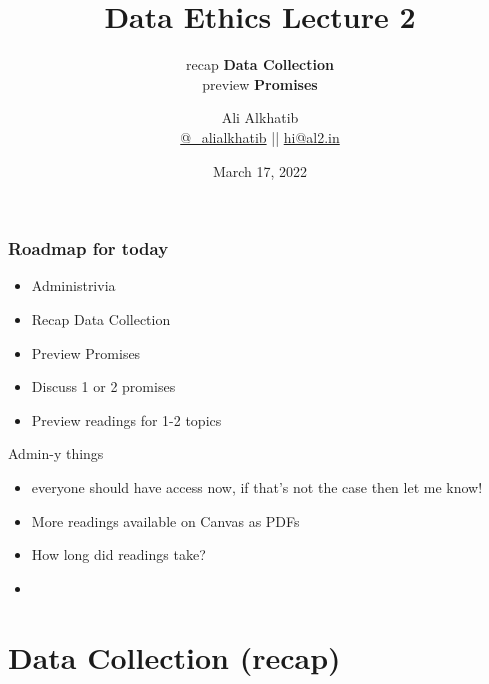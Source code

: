 \documentclass[aspectratio=43,17pt]{beamer} %
\title{Data Ethics Lecture 2}
\subtitle{recap {\bfseries Data Collection}\\preview {\bfseries Promises}}
\author[Ali Alkhatib]{{Ali Alkhatib}\\
\href{http://twitter.com/_alialkhatib}{@\_alialkhatib} || \href{mailto:hi@al2.in}{hi@al2.in}}
\date{March 17, 2022}
\newcommand{\onlyinsubfile}[1]{#1}
\newcommand{\notinsubfile}[1]{}
\begin{document}
\renewcommand{\onlyinsubfile}[1]{}
\renewcommand{\notinsubfile}[1]{#1}


\begin{frame}
\titlepage
\end{frame}

\begin{frame}[t]\frametitle{Roadmap for today}

\begin{itemize}
    \item Administrivia
    \item Recap Data Collection
    \item Preview Promises
    \item Discuss 1 or 2 promises
    \item Preview readings for 1-2 topics
\end{itemize}

\end{frame}


\begin{frame}{Admin-y things}
  

\begin{itemize}
    \item {}
    
    {\small everyone should have access now, if that's not the case then let me know!}
    \item {}
    
    {\small More readings available on Canvas as PDFs}
    \item {}

    {\small How long did readings take?}
    
    \item {}
\end{itemize}

\end{frame}


\section{Data Collection (recap)}
\end{document}
